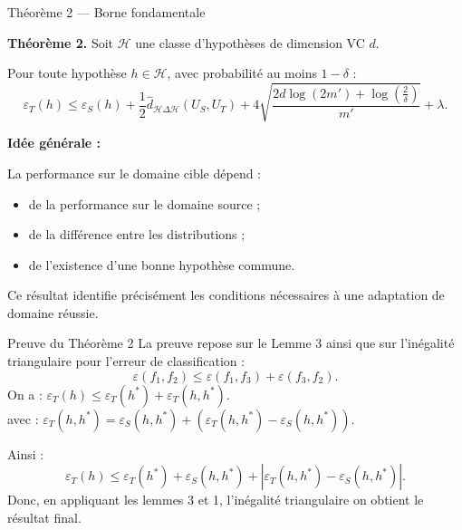 \documentclass[11pt]{beamer}
\begin{document}
\begin{frame}{Théorème 2 — Borne fondamentale}

\textbf{Théorème 2.}  
Soit $\mathcal H$ une classe d’hypothèses de dimension VC $d$.

\vspace{0.2cm}

Pour toute hypothèse $h \in \mathcal H$, avec probabilité au moins
$1-\delta$ :
\[
\varepsilon_T(h)
\le
\varepsilon_S(h)
+
\frac12
\hat d_{\mathcal H \Delta \mathcal H}(U_S,U_T)
+
4
\sqrt{
\frac{
2d\log(2m')
+
\log\left(\frac{2}{\delta}\right)
}{m'}
}
+
\lambda.
\]

\vspace{0.3cm}

\textbf{Idée générale :}

La performance sur le domaine cible dépend :
\begin{itemize}
    \item de la performance sur le domaine source ;
    \item de la différence entre les distributions ;
    \item de l’existence d’une bonne hypothèse commune.
\end{itemize}
Ce résultat identifie précisément les conditions nécessaires à une adaptation de domaine réussie.
\end{frame}


\begin{frame}{Preuve du Théorème 2}
La preuve repose sur le Lemme 3 ainsi que sur l’inégalité triangulaire pour l’erreur de classification :
\[
\varepsilon(f_1, f_2) \le \varepsilon(f_1, f_3) + \varepsilon(f_3, f_2).
\]
On a : $
\varepsilon_T(h)
\le
\varepsilon_T(h^*) + \varepsilon_T(h, h^*).$\\
avec : $
\varepsilon_T(h, h^*)
=
\varepsilon_S(h, h^*)
+ \left( \varepsilon_T(h, h^*) - \varepsilon_S(h, h^*) \right).$

Ainsi :
\[
\varepsilon_T(h)
\le
\varepsilon_T(h^*) + \varepsilon_S(h, h^*)
+ \left| \varepsilon_T(h, h^*) - \varepsilon_S(h, h^*) \right|.
\]
Donc, en appliquant les lemmes 3 et 1, l'inégalité triangulaire on obtient le résultat final.
\end{frame}




\end{document}
